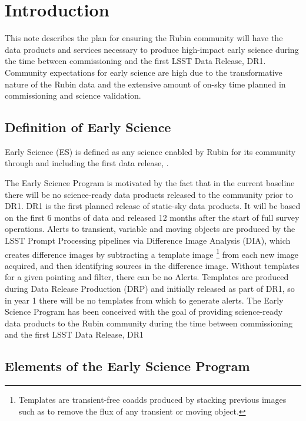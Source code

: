 \section{Introduction}

This note describes the plan for ensuring the Rubin community will have the data products and services necessary to produce high-impact early science during the time between commissioning and the first LSST Data Release, DR1.  
Community expectations for early science are high due to the transformative nature of the Rubin data and the extensive amount of on-sky time planned in commissioning and science validation.

\subsection{Definition of Early Science}  \label{ssec:defn}

Early Science (ES) is defined as any science enabled by Rubin for its community through and including the first data release, \drone.

The Early Science Program is motivated by the fact that in the current baseline there will be no science-ready data products released to the community prior to DR1. 
DR1 is the first planned release of static-sky data products. 
It will be based on the first 6 months of data and released 12 months after the start of full survey operations.  
Alerts to transient, variable and moving objects are produced by the LSST Prompt Processing pipelines via Difference Image Analysis (DIA), which creates difference images by subtracting a template image \footnote{Templates are transient-free coadds produced by stacking previous images such as to remove the flux of any transient or moving object.} from each new image acquired, and then identifying sources in the difference image. 
Without templates for a given pointing and filter, there can be no Alerts.
Templates are produced during Data Release Production (DRP) and initially released as part of DR1, so in year 1 there will be no templates from which to generate alerts.
The Early Science Program has been conceived with the goal of providing science-ready data products to the Rubin community during the time between commissioning and the first LSST Data Release, DR1 

\subsection{Elements of the Early Science Program}

